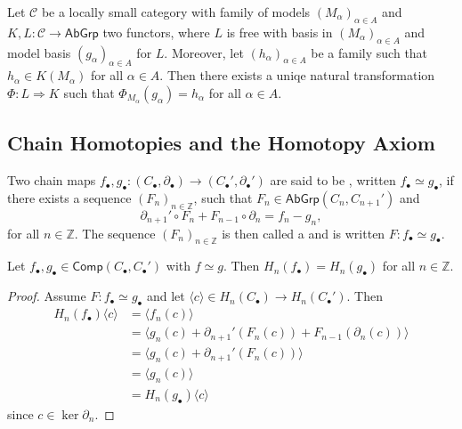 \begin{proposition}
	Let $\mathcal{C}$ be a locally small category with family of models $(M_\alpha)_{\alpha \in A}$ and $K,L : \mathcal{C} \to \mathsf{AbGrp}$ two functors, where $L$ is free with basis in $(M_\alpha)_{\alpha \in A}$ and model basis $(g_\alpha)_{\alpha \in A}$ for $L$. Moreover, let $(h_\alpha)_{\alpha \in A}$ be a family such that $h_\alpha \in K(M_\alpha)$ for all $\alpha \in A$. Then there exists a uniqe natural transformation $\Phi : L \Rightarrow K$ such that $\Phi_{M_\alpha}(g_\alpha) = h_\alpha$ for all $\alpha \in A$.
\end{proposition}

\subsection*{Chain Homotopies and the Homotopy Axiom}
\begin{definition}
	Two chain maps $f_\bullet,g_\bullet : (C_\bullet,\partial_\bullet) \to (C_\bullet',\partial_\bullet')$ are said to be , written $f_\bullet \simeq g_\bullet$, if there exists a sequence $(F_n)_{n \in \mathbb{Z}}$, such that $F_n \in \mathsf{AbGrp}(C_n,C_{n + 1}')$ and 
	\begin{equation*}
		\partial_{n + 1}' \circ F_n + F_{n - 1} \circ \partial_n = f_n - g_n,
	\end{equation*}
	\noindent for all $n \in \mathbb{Z}$. The sequence $(F_n)_{n \in \mathbb{Z}}$ is then called a  and is written $F : f_\bullet \simeq g_\bullet$.
\end{definition}

\begin{proposition}
	\label{prop:inclusions}
	Let $f_\bullet,g_\bullet \in \mathsf{Comp}(C_\bullet,C_\bullet')$ with $f \simeq g$. Then $H_n(f_\bullet) = H_n(g_\bullet)$ for all $n \in \mathbb{Z}$.
\end{proposition}

\begin{proof}
	Assume $F : f_\bullet \simeq g_\bullet$ and let $\langle c \rangle \in H_n(C_\bullet) \to H_n(C_\bullet')$. Then
	\begin{align*}
		H_n(f_\bullet)\langle c \rangle &= \langle f_n(c) \rangle\\
		&= \langle g_n(c) + \partial_{n + 1}'(F_n(c)) + F_{n - 1}(\partial_n(c)) \rangle\\
		&= \langle g_n(c) + \partial_{n + 1}'(F_n(c)) \rangle\\
		&= \langle g_n(c) \rangle\\
		&= H_n(g_\bullet)\langle c \rangle
	\end{align*}
	\noindent since $c \in \ker \partial_n$.
\end{proof}

